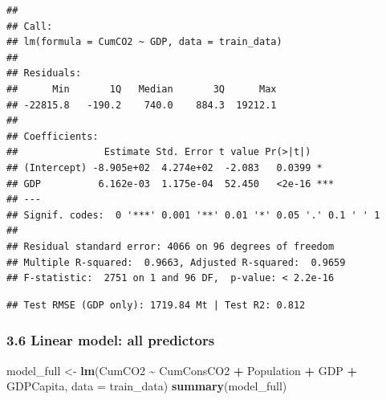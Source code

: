 \documentclass[
]{article}
\newenvironment{Shaded}{\begin{snugshade}}{\end{snugshade}}
\newcommand{\AttributeTok}[1]{\textcolor[rgb]{0.13,0.29,0.53}{#1}}
\newcommand{\DecValTok}[1]{\textcolor[rgb]{0.00,0.00,0.81}{#1}}
\newcommand{\FunctionTok}[1]{\textcolor[rgb]{0.13,0.29,0.53}{\textbf{#1}}}
\newcommand{\NormalTok}[1]{#1}
\newcommand{\OtherTok}[1]{\textcolor[rgb]{0.56,0.35,0.01}{#1}}
\newcommand{\SpecialCharTok}[1]{\textcolor[rgb]{0.81,0.36,0.00}{\textbf{#1}}}
\newcommand{\StringTok}[1]{\textcolor[rgb]{0.31,0.60,0.02}{#1}}
\begin{document}
\begin{verbatim}
## 
## Call:
## lm(formula = CumCO2 ~ GDP, data = train_data)
## 
## Residuals:
##      Min       1Q   Median       3Q      Max 
## -22815.8   -190.2    740.0    884.3  19212.1 
## 
## Coefficients:
##               Estimate Std. Error t value Pr(>|t|)    
## (Intercept) -8.905e+02  4.274e+02  -2.083   0.0399 *  
## GDP          6.162e-03  1.175e-04  52.450   <2e-16 ***
## ---
## Signif. codes:  0 '***' 0.001 '**' 0.01 '*' 0.05 '.' 0.1 ' ' 1
## 
## Residual standard error: 4066 on 96 degrees of freedom
## Multiple R-squared:  0.9663, Adjusted R-squared:  0.9659 
## F-statistic:  2751 on 1 and 96 DF,  p-value: < 2.2e-16
\end{verbatim}

\begin{Shaded}
\end{Shaded}

\begin{verbatim}
## Test RMSE (GDP only): 1719.84 Mt | Test R2: 0.812
\end{verbatim}

\subsubsection{3.6 Linear model: all
predictors}\label{linear-model-all-predictors}

\begin{Shaded}
\begin{Highlighting}[]
\NormalTok{model\_full }\OtherTok{\textless{}{-}} \FunctionTok{lm}\NormalTok{(CumCO2 }\SpecialCharTok{\textasciitilde{}}\NormalTok{ CumConsCO2 }\SpecialCharTok{+}\NormalTok{ Population }\SpecialCharTok{+}\NormalTok{ GDP }\SpecialCharTok{+}\NormalTok{ GDPCapita,}
                 \AttributeTok{data =}\NormalTok{ train\_data)}
\FunctionTok{summary}\NormalTok{(model\_full)}
\end{Highlighting}
\end{Shaded}
\end{document}
